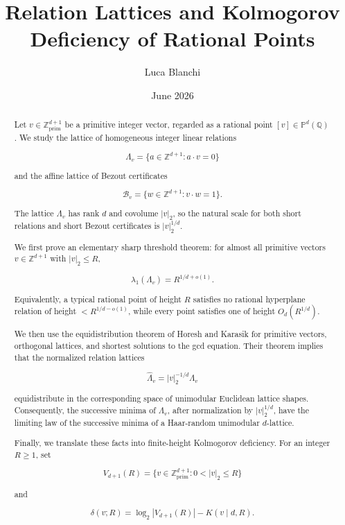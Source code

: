 \documentclass[11pt]{article}
\begin{document}
\title{Relation Lattices and Kolmogorov Deficiency of Rational Points}
\author{Luca Blanchi}
\date{June 2026}

\maketitle

\begin{abstract}
Let $v\in\mathbb Z^{d+1}_{\mathrm{prim}}$ be a primitive integer vector, regarded as a rational point $[v]\in\mathbb P^d(\mathbb Q)$. We study the lattice of homogeneous integer linear relations

\[
\Lambda_v=\{a\in\mathbb Z^{d+1}:a\cdot v=0\}
\]

and the affine lattice of Bezout certificates

\[
\mathcal B_v=\{w\in\mathbb Z^{d+1}:v\cdot w=1\}.
\]

The lattice $\Lambda_v$ has rank $d$ and covolume $|v|_2$, so the natural scale for both short relations and short Bezout certificates is $|v|_2^{1/d}$.

We first prove an elementary sharp threshold theorem: for almost all primitive vectors $v\in\mathbb Z^{d+1}$ with $|v|_2\le R$,

\[
\lambda_1(\Lambda_v)=R^{1/d+o(1)}.
\]

Equivalently, a typical rational point of height $R$ satisfies no rational hyperplane relation of height $<R^{1/d-o(1)}$, while every point satisfies one of height $O_d(R^{1/d})$.

We then use the equidistribution theorem of Horesh and Karasik for primitive vectors, orthogonal lattices, and shortest solutions to the gcd equation. Their theorem implies that the normalized relation lattices

\[
\widehat\Lambda_v=|v|_2^{-1/d}\Lambda_v
\]

equidistribute in the corresponding space of unimodular Euclidean lattice shapes. Consequently, the successive minima of $\Lambda_v$, after normalization by $|v|_2^{1/d}$, have the limiting law of the successive minima of a Haar-random unimodular $d$-lattice.

Finally, we translate these facts into finite-height Kolmogorov deficiency. For an integer $R\ge1$, set

\[
V_{d+1}(R)=\{v\in\mathbb Z^{d+1}_{\mathrm{prim}}:0<|v|_2\le R\}
\]

and

\[
\delta(v;R)=\log_2|V_{d+1}(R)|-K(v\mid d,R).
\]


\end{abstract}
\end{document}
